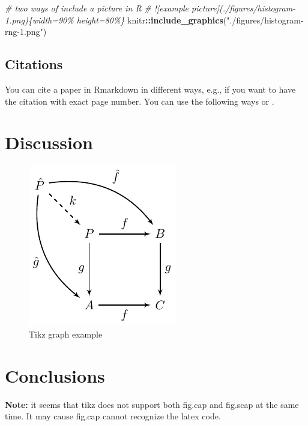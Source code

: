 \documentclass[
]{article}
\newenvironment{Shaded}{\begin{snugshade}}{\end{snugshade}}
\newcommand{\CommentTok}[1]{\textcolor[rgb]{0.56,0.35,0.01}{\textit{#1}}}
\newcommand{\FunctionTok}[1]{\textcolor[rgb]{0.13,0.29,0.53}{\textbf{#1}}}
\newcommand{\NormalTok}[1]{#1}
\newcommand{\SpecialCharTok}[1]{\textcolor[rgb]{0.81,0.36,0.00}{\textbf{#1}}}
\newcommand{\StringTok}[1]{\textcolor[rgb]{0.31,0.60,0.02}{#1}}
\begin{document}
\begin{Shaded}
\begin{Highlighting}[]
\CommentTok{\# two ways of include a picture in R}
\CommentTok{\# ![example picture](./figures/histogram{-}1.png)\{width=90\% height=80\%\}}
\NormalTok{knitr}\SpecialCharTok{::}\FunctionTok{include\_graphics}\NormalTok{(}\StringTok{"./figures/histogram{-}rng{-}1.png"}\NormalTok{)}
\end{Highlighting}
\end{Shaded}

\subsection{Citations}\label{citations}

You can cite a paper in Rmarkdown in different ways, e.g., if you want to have the citation with exact page number. You can use the following ways \autocite[see][45]{Jing2022} or \textcite[404]{Jing2022}.

\section{Discussion}\label{discussion}

\begin{figure}
\centering
\includegraphics{figures/simpletikz-1.pdf}
\caption{\label{fig:simpletikz}Tikz graph example}
\end{figure}

\section{Conclusions}\label{conclusions}

\textbf{Note:} it seems that tikz does not support both fig.cap and fig.scap at the same time. It may cause fig.cap cannot recognize the latex code.
\end{document}
